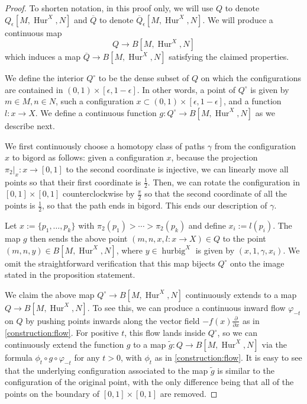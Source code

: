 \documentclass[12 pt]{amsart}
\theoremstyle{plain}
\theoremstyle{definition}
\theoremstyle{remark}
\numberwithin{equation}{section}
\DeclareMathOperator\Hur{Hur}
\begin{document}
\begin{proof}
		To shorten notation, in this proof only, we will use $Q$ to denote
	$Q_{\epsilon}[M,\Hur^{X},N]$ and $\overline{Q}$ to denote $\overline{Q}_{\epsilon}[M,\Hur^{X},N]$.
	We will produce a continuous map 
	$$Q \to B[M,\Hur^{X},N]$$ which induces a map $\overline{Q} \to B[M,
	\Hur^X, N]$ satisfying the claimed properties.
	
	We define the interior $Q^{\circ}$ to be the dense subset of $Q$ on
	which the configurations are contained in $(0,1)\times [\epsilon,1-\epsilon]$. In other
	words, a point of $Q^{\circ}$ is given by $m \in M, n \in N$,
	such a configuration $x \subset (0,1) \times [\epsilon,1-\epsilon]$, and a
	function $l: x \to X$. We define a continuous function $g:Q^{\circ}\to
	B[M,\Hur^{X},N]$ as we describe next. 
	
	We first continuously choose a homotopy
	class of paths $\gamma$ from the configuration $x$ to $\mathrm{bigord}$ as
	follows: given a configuration $x$, because the projection $\pi_2|_x : x
	\to [0,1]$ to the second
	coordinate is injective, we can linearly move all points so that their
	first coordinate is $\frac 1 2$. Then, we can rotate the configuration in
	$[0,1] \times [0,1]$ counterclockwise by $\frac \pi 2$
	so that the second coordinate of all the points is
	$\frac 1 2$, so that the path ends in $\mathrm{bigord}$. This ends our description of $\gamma$.
	
	
	Let $x := \{p_1, \ldots, p_k\}$ with $\pi_2(p_1) > \cdots > \pi_2(p_k)$
	and define $x_i := l(p_i)$. 
	The map $g$ then sends the above point $(m,n,x,l:x \to X) \in Q$ to the
	point $(m,n,y) \in B[M,\Hur^{X},N]$, where $y \in
	\operatorname{hurbig}^{X}$ is given by $(x,1,\gamma,x_i)$. We omit the
	straightforward verification that
	this map bijects $Q^{\circ}$ onto the image stated in the proposition statement.
	
	We claim the above map $Q^\circ \to B[M,\Hur^X,N]$ continuously extends
to a map $Q \to B[M,\Hur^X,N]$. To see this,
	we can produce a continuous inward flow $\varphi_{-t}$ on $Q$ by pushing
	points inwards along the vector field $-f(x)\frac{\partial}{\partial x}$
	as in \autoref{construction:flow}. For positive $t$, this flow lands inside
	$Q^{\circ}$, so we can continuously extend the function $g$ to a map $\tilde{g}:Q \to B[M,\Hur^{X},N]$ 
	via the formula $\phi_t \circ g\circ \varphi_{-t}$ for any $t>0$, with
	$\phi_t$ as in \autoref{construction:flow}. It is easy to see that the
	underlying configuration associated to the map $\tilde{g}$ is similar to
	the configuration of the original point, with the only difference being
	that all of the points on the boundary of $[0,1] \times [0,1]$ are removed.
	

\end{proof}
\end{document}
